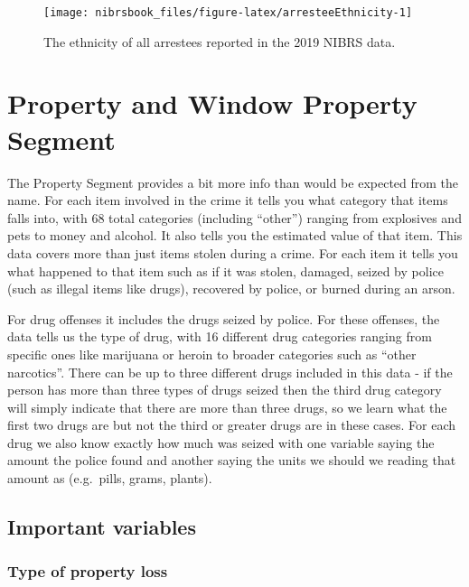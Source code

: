 \documentclass[
  12pt,
  openany]{book}
\begin{document}
\begin{figure}

{\centering \texttt{[image: nibrsbook\_files/figure-latex/arresteeEthnicity-1]} 

}

\caption{The ethnicity of all arrestees reported in the 2019 NIBRS data.}\label{fig:arresteeEthnicity}
\end{figure}

\hypertarget{property-and-window-property-segment}{%
\chapter{Property and Window Property Segment}\label{property-and-window-property-segment}}

The Property Segment provides a bit more info than would be expected from the name. For each item involved in the crime it tells you what category that items falls into, with 68 total categories (including ``other'') ranging from explosives and pets to money and alcohol. It also tells you the estimated value of that item. This data covers more than just items stolen during a crime. For each item it tells you what happened to that item such as if it was stolen, damaged, seized by police (such as illegal items like drugs), recovered by police, or burned during an arson.

For drug offenses it includes the drugs seized by police. For these offenses, the data tells us the type of drug, with 16 different drug categories ranging from specific ones like marijuana or heroin to broader categories such as ``other narcotics''. There can be up to three different drugs included in this data - if the person has more than three types of drugs seized then the third drug category will simply indicate that there are more than three drugs, so we learn what the first two drugs are but not the third or greater drugs are in these cases. For each drug we also know exactly how much was seized with one variable saying the amount the police found and another saying the units we should we reading that amount as (e.g.~pills, grams, plants).

\hypertarget{important-variables-5}{%
\section{Important variables}\label{important-variables-5}}

\hypertarget{type-of-property-loss}{%
\subsection{Type of property loss}\label{type-of-property-loss}}
\end{document}
